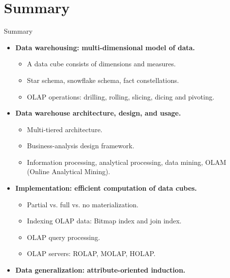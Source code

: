 \section{Summary}


\begin{frame}{Summary}
  \begin{itemize}
  \item \textbf{Data warehousing: multi-dimensional model of data.}
    \begin{itemize}
    \item A data cube consists of dimensions and measures.
    \item Star schema, snowflake schema, fact constellations.
    \item OLAP operations: drilling, rolling, slicing, dicing and pivoting.
    \end{itemize}
  \item \textbf{Data warehouse architecture, design, and usage.}
    \begin{itemize}
    \item Multi-tiered architecture.
    \item Business-analysis design framework.
    \item Information processing, analytical processing, data mining, OLAM (Online Analytical Mining).
    \end{itemize}
  \item \textbf{Implementation: efficient computation of data cubes.}
    \begin{itemize}
    \item Partial vs. full vs. no materialization.
    \item Indexing OLAP data: Bitmap index and join index.
    \item OLAP query processing.
    \item OLAP servers: ROLAP, MOLAP, HOLAP.
    \end{itemize}
  \item \textbf{Data generalization: attribute-oriented induction.}
  \end{itemize}
\end{frame}
